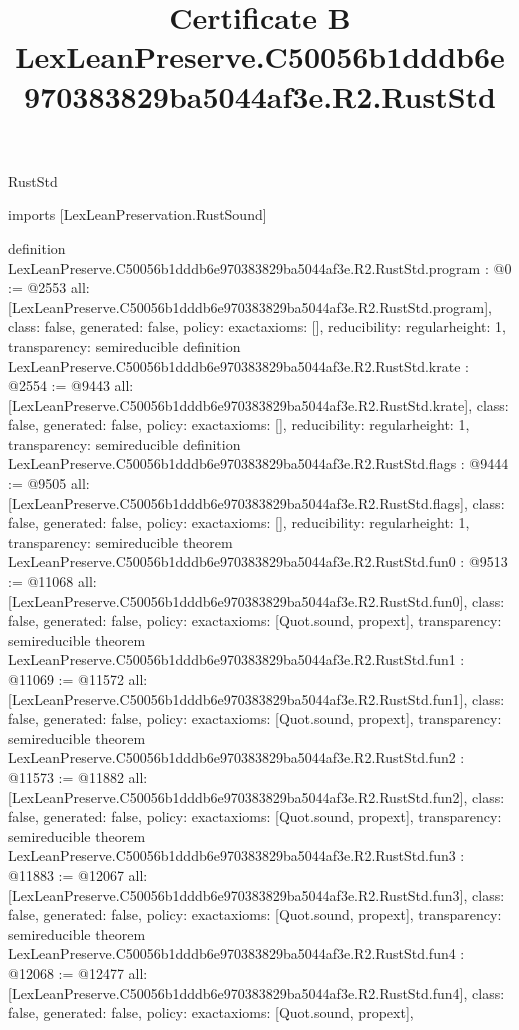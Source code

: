\begin{lexlean}{RustStd}
\title{Certificate B LexLeanPreserve.C50056b1dddb6e970383829ba5044af3e.R2.RustStd}
\begin{coremodule}
imports [LexLeanPreservation.RustSound]

definition LexLeanPreserve.C50056b1dddb6e970383829ba5044af3e.R2.RustStd.program : @0 := @2553 {
  all: [LexLeanPreserve.C50056b1dddb6e970383829ba5044af3e.R2.RustStd.program],
  class: false,
  generated: false,
  policy: exact{axioms: []},
  reducibility: regular{height: 1},
  transparency: semireducible
}
definition LexLeanPreserve.C50056b1dddb6e970383829ba5044af3e.R2.RustStd.krate : @2554 := @9443 {
  all: [LexLeanPreserve.C50056b1dddb6e970383829ba5044af3e.R2.RustStd.krate],
  class: false,
  generated: false,
  policy: exact{axioms: []},
  reducibility: regular{height: 1},
  transparency: semireducible
}
definition LexLeanPreserve.C50056b1dddb6e970383829ba5044af3e.R2.RustStd.flags : @9444 := @9505 {
  all: [LexLeanPreserve.C50056b1dddb6e970383829ba5044af3e.R2.RustStd.flags],
  class: false,
  generated: false,
  policy: exact{axioms: []},
  reducibility: regular{height: 1},
  transparency: semireducible
}
theorem LexLeanPreserve.C50056b1dddb6e970383829ba5044af3e.R2.RustStd.fun0 : @9513 := @11068 {
  all: [LexLeanPreserve.C50056b1dddb6e970383829ba5044af3e.R2.RustStd.fun0],
  class: false,
  generated: false,
  policy: exact{axioms: [Quot.sound, propext]},
  transparency: semireducible
}
theorem LexLeanPreserve.C50056b1dddb6e970383829ba5044af3e.R2.RustStd.fun1 : @11069 := @11572 {
  all: [LexLeanPreserve.C50056b1dddb6e970383829ba5044af3e.R2.RustStd.fun1],
  class: false,
  generated: false,
  policy: exact{axioms: [Quot.sound, propext]},
  transparency: semireducible
}
theorem LexLeanPreserve.C50056b1dddb6e970383829ba5044af3e.R2.RustStd.fun2 : @11573 := @11882 {
  all: [LexLeanPreserve.C50056b1dddb6e970383829ba5044af3e.R2.RustStd.fun2],
  class: false,
  generated: false,
  policy: exact{axioms: [Quot.sound, propext]},
  transparency: semireducible
}
theorem LexLeanPreserve.C50056b1dddb6e970383829ba5044af3e.R2.RustStd.fun3 : @11883 := @12067 {
  all: [LexLeanPreserve.C50056b1dddb6e970383829ba5044af3e.R2.RustStd.fun3],
  class: false,
  generated: false,
  policy: exact{axioms: [Quot.sound, propext]},
  transparency: semireducible
}
theorem LexLeanPreserve.C50056b1dddb6e970383829ba5044af3e.R2.RustStd.fun4 : @12068 := @12477 {
  all: [LexLeanPreserve.C50056b1dddb6e970383829ba5044af3e.R2.RustStd.fun4],
  class: false,
  generated: false,
  policy: exact{axioms: [Quot.sound, propext]},
}
\end{coremodule}
\end{lexlean}
